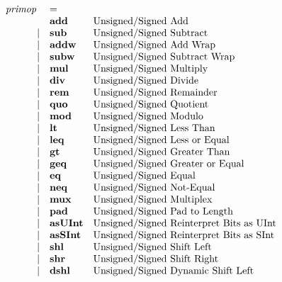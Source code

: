\documentclass[10pt]{article}
\begin{document}
\[
\begin{array}{rll}
\text{\em primop\ }     &= \\
                &\text{\bf add}            &\text{Unsigned/Signed Add}\\
\vert           &\text{\bf sub}            &\text{Unsigned/Signed Subtract}\\
\vert           &\text{\bf addw}           &\text{Unsigned/Signed Add Wrap}\\
\vert           &\text{\bf subw}           &\text{Unsigned/Signed Subtract Wrap}\\
\vert           &\text{\bf mul}            &\text{Unsigned/Signed Multiply}\\
\vert           &\text{\bf div}            &\text{Unsigned/Signed Divide}\\
\vert           &\text{\bf rem}            &\text{Unsigned/Signed Remainder}\\
\vert           &\text{\bf quo}            &\text{Unsigned/Signed Quotient}\\
\vert           &\text{\bf mod}            &\text{Unsigned/Signed Modulo}\\
\vert           &\text{\bf lt}             &\text{Unsigned/Signed Less Than}\\
\vert           &\text{\bf leq}            &\text{Unsigned/Signed Less or Equal}\\
\vert           &\text{\bf gt}             &\text{Unsigned/Signed Greater Than}\\
\vert           &\text{\bf geq}            &\text{Unsigned/Signed Greater or Equal}\\
\vert           &\text{\bf eq}             &\text{Unsigned/Signed Equal}\\
\vert           &\text{\bf neq}            &\text{Unsigned/Signed Not-Equal}\\
\vert           &\text{\bf mux}            &\text{Unsigned/Signed Multiplex}\\
\vert           &\text{\bf pad}            &\text{Unsigned/Signed Pad to Length}\\
\vert           &\text{\bf asUInt}         &\text{Unsigned/Signed Reinterpret Bits as UInt}\\
\vert           &\text{\bf asSInt}         &\text{Unsigned/Signed Reinterpret Bits as SInt}\\
\vert           &\text{\bf shl}            &\text{Unsigned/Signed Shift Left}\\
\vert           &\text{\bf shr}            &\text{Unsigned/Signed Shift Right}\\
\vert           &\text{\bf dshl}           &\text{Unsigned/Signed Dynamic Shift Left}\\

\end{array}\]
\end{document}
